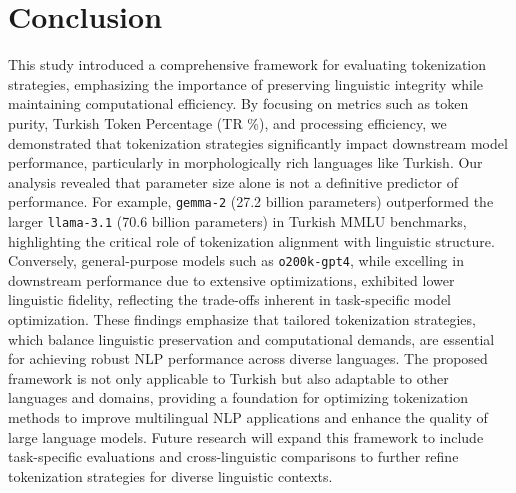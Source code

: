 \section{Conclusion}

This study introduced a comprehensive framework for evaluating tokenization strategies, emphasizing the importance of preserving linguistic integrity while maintaining computational efficiency. By focusing on metrics such as token purity, Turkish Token Percentage (TR \%), and processing efficiency, we demonstrated that tokenization strategies significantly impact downstream model performance, particularly in morphologically rich languages like Turkish. Our analysis revealed that parameter size alone is not a definitive predictor of performance. For example, \texttt{gemma-2} (27.2 billion parameters) outperformed the larger \texttt{llama-3.1} (70.6 billion parameters) in Turkish MMLU benchmarks, highlighting the critical role of tokenization alignment with linguistic structure. Conversely, general-purpose models such as \texttt{o200k-gpt4}, while excelling in downstream performance due to extensive optimizations, exhibited lower linguistic fidelity, reflecting the trade-offs inherent in task-specific model optimization. These findings emphasize that tailored tokenization strategies, which balance linguistic preservation and computational demands, are essential for achieving robust NLP performance across diverse languages. The proposed framework is not only applicable to Turkish but also adaptable to other languages and domains, providing a foundation for optimizing tokenization methods to improve multilingual NLP applications and enhance the quality of large language models. Future research will expand this framework to include task-specific evaluations and cross-linguistic comparisons to further refine tokenization strategies for diverse linguistic contexts.
